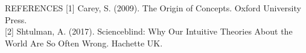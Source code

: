\documentclass[final]{beamer}
\newlength{\colwidth}
\newlength{\widecolwidth}
\begin{document}
\begin{frame}[t]
\begin{columns}[t]
\begin{column}{\widecolwidth}
  \begin{block}{REFERENCES}
  \footnotesize
	[1] Carey, S. (2009). The Origin of Concepts. Oxford University Press.\\[1ex]
	[2] Shtulman, A. (2017). Scienceblind: Why Our Intuitive Theories About the World Are So Often Wrong. Hachette UK.\\[1ex]
  \end{block}

\end{column}
\end{columns}
\end{frame}
\end{document}
